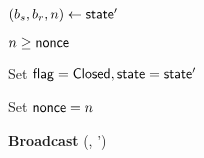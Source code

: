 \begin{bbox}[title={$\mathcal{C}_{pay}(P_s,P_r, \msf{balances}, \Delta)$}]
\begin{renumerate}
		\item $(b_s, b_r, n) \leftarrow {\mathsf {state}}'$
		\item \Require $n \geq {\mathsf {nonce}}$

		\item Set ${\mathsf {flag}} = {\mathsf {Closed}}, {\mathsf {state}} = {\mathsf {state}}'$
		\item Set ${\mathsf {nonce}} = n$
		
		{\bf Broadcast} (, ')
	\end{renumerate}
\end{bbox}


